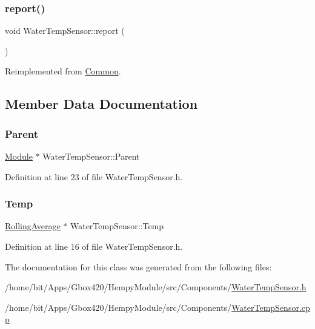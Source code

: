 \subsubsection{\texorpdfstring{report()}{report()}\hspace{0.1cm}{\footnotesize\ttfamily [2/2]}}
{\footnotesize\ttfamily void Water\+Temp\+Sensor\+::report (\begin{DoxyParamCaption}{ }\end{DoxyParamCaption})\hspace{0.3cm}{\ttfamily [virtual]}}



Reimplemented from \hyperlink{class_common_a9e60e2c26a5f4d72342a59a969954636}{Common}.



\subsection{Member Data Documentation}
\mbox{\label{class_water_temp_sensor_a955eb4c3335d1971cec6c2d68d29c8c6}} 
\subsubsection{\texorpdfstring{Parent}{Parent}}
{\footnotesize\ttfamily \hyperlink{class_module}{Module} $\ast$ Water\+Temp\+Sensor\+::\+Parent\hspace{0.3cm}{\ttfamily [protected]}}



Definition at line 23 of file Water\+Temp\+Sensor.\+h.

\mbox{\label{class_water_temp_sensor_a6f6623a98752218ef94136d60280ff8e}} 
\subsubsection{\texorpdfstring{Temp}{Temp}}
{\footnotesize\ttfamily \hyperlink{class_rolling_average}{Rolling\+Average} $\ast$ Water\+Temp\+Sensor\+::\+Temp}



Definition at line 16 of file Water\+Temp\+Sensor.\+h.



The documentation for this class was generated from the following files\+:\begin{DoxyCompactItemize}
\item 
/home/bit/\+Apps/\+Gbox420/\+Hempy\+Module/src/\+Components/\hyperlink{_hempy_module_2src_2_components_2_water_temp_sensor_8h}{Water\+Temp\+Sensor.\+h}\item 
/home/bit/\+Apps/\+Gbox420/\+Hempy\+Module/src/\+Components/\hyperlink{_hempy_module_2src_2_components_2_water_temp_sensor_8cpp}{Water\+Temp\+Sensor.\+cpp}\end{DoxyCompactItemize}
